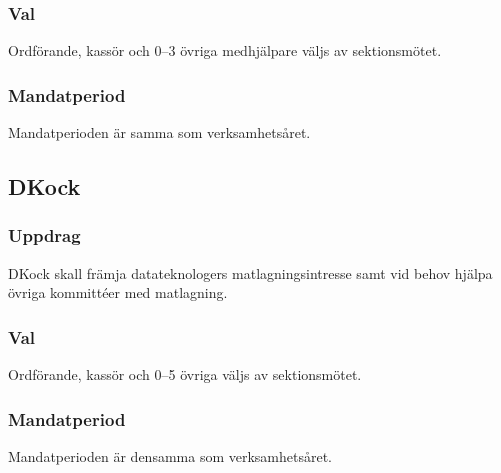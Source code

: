 \subsubsection{Val}
Ordförande, kassör och 0--3 övriga medhjälpare väljs av sektionsmötet. 
\subsubsection{Mandatperiod}
Mandatperioden är samma som verksamhetsåret. 


\subsection{DKock}
\subsubsection{Uppdrag}
DKock skall främja datateknologers matlagningsintresse samt vid behov hjälpa övriga kommittéer med matlagning.
\subsubsection{Val}
Ordförande, kassör och 0--5 övriga väljs av sektionsmötet.
\subsubsection{Mandatperiod}
Mandatperioden är densamma som verksamhetsåret.

\newpage
